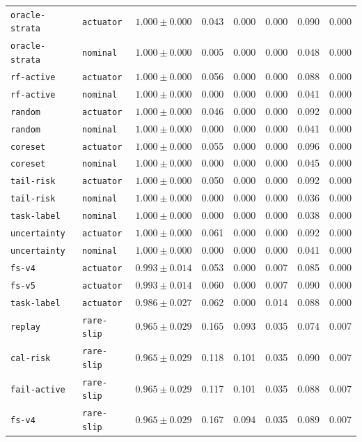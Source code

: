 \documentclass{article}
\begin{document}
\begin{center}
\begin{tabular}{llcccccc}
\texttt{oracle-strata} & \texttt{actuator} & $1.000 \pm 0.000$ & 0.043 & 0.000 & 0.000 & 0.090 & 0.000 \\
\texttt{oracle-strata} & \texttt{nominal} & $1.000 \pm 0.000$ & 0.005 & 0.000 & 0.000 & 0.048 & 0.000 \\
\texttt{rf-active} & \texttt{actuator} & $1.000 \pm 0.000$ & 0.056 & 0.000 & 0.000 & 0.088 & 0.000 \\
\texttt{rf-active} & \texttt{nominal} & $1.000 \pm 0.000$ & 0.000 & 0.000 & 0.000 & 0.041 & 0.000 \\
\texttt{random} & \texttt{actuator} & $1.000 \pm 0.000$ & 0.046 & 0.000 & 0.000 & 0.092 & 0.000 \\
\texttt{random} & \texttt{nominal} & $1.000 \pm 0.000$ & 0.000 & 0.000 & 0.000 & 0.041 & 0.000 \\
\texttt{coreset} & \texttt{actuator} & $1.000 \pm 0.000$ & 0.055 & 0.000 & 0.000 & 0.096 & 0.000 \\
\texttt{coreset} & \texttt{nominal} & $1.000 \pm 0.000$ & 0.000 & 0.000 & 0.000 & 0.045 & 0.000 \\
\texttt{tail-risk} & \texttt{actuator} & $1.000 \pm 0.000$ & 0.050 & 0.000 & 0.000 & 0.092 & 0.000 \\
\texttt{tail-risk} & \texttt{nominal} & $1.000 \pm 0.000$ & 0.000 & 0.000 & 0.000 & 0.036 & 0.000 \\
\texttt{task-label} & \texttt{nominal} & $1.000 \pm 0.000$ & 0.000 & 0.000 & 0.000 & 0.038 & 0.000 \\
\texttt{uncertainty} & \texttt{actuator} & $1.000 \pm 0.000$ & 0.061 & 0.000 & 0.000 & 0.092 & 0.000 \\
\texttt{uncertainty} & \texttt{nominal} & $1.000 \pm 0.000$ & 0.000 & 0.000 & 0.000 & 0.041 & 0.000 \\
\texttt{fs-v4} & \texttt{actuator} & $0.993 \pm 0.014$ & 0.053 & 0.000 & 0.007 & 0.085 & 0.000 \\
\texttt{fs-v5} & \texttt{actuator} & $0.993 \pm 0.014$ & 0.060 & 0.000 & 0.007 & 0.090 & 0.000 \\
\texttt{task-label} & \texttt{actuator} & $0.986 \pm 0.027$ & 0.062 & 0.000 & 0.014 & 0.088 & 0.000 \\
\texttt{replay} & \texttt{rare-slip} & $0.965 \pm 0.029$ & 0.165 & 0.093 & 0.035 & 0.074 & 0.007 \\
\texttt{cal-risk} & \texttt{rare-slip} & $0.965 \pm 0.029$ & 0.118 & 0.101 & 0.035 & 0.090 & 0.007 \\
\texttt{fail-active} & \texttt{rare-slip} & $0.965 \pm 0.029$ & 0.117 & 0.101 & 0.035 & 0.088 & 0.007 \\
\texttt{fs-v4} & \texttt{rare-slip} & $0.965 \pm 0.029$ & 0.167 & 0.094 & 0.035 & 0.089 & 0.007 \\
\bottomrule
\end{tabular}
\end{center}
\end{document}
